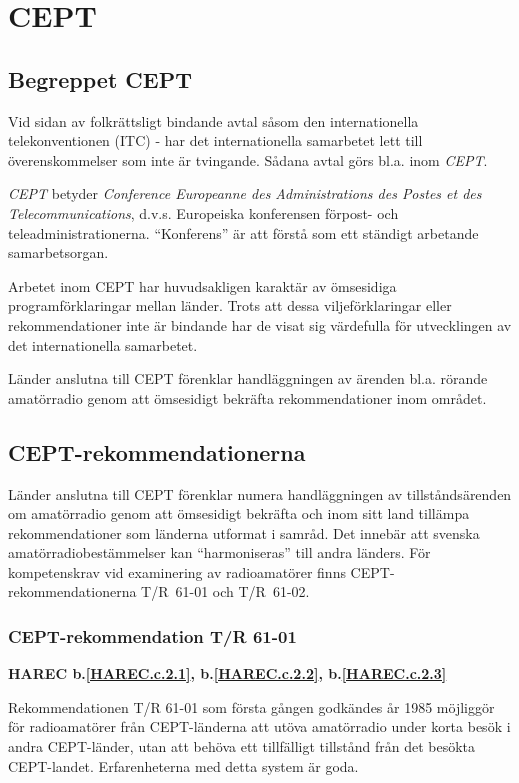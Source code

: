 \section{CEPT}

\subsection{Begreppet CEPT}

Vid sidan av folkrättsligt bindande avtal såsom den internationella
telekonventionen (ITC) - har det internationella samarbetet lett till
överenskommelser som inte är tvingande. Sådana avtal görs bl.a. inom
\emph{CEPT}.

\emph{CEPT} betyder \emph{Conference Europeanne des Administrations
  des Postes et des Telecommunications}, d.v.s. Europeiska konferensen
förpost- och teleadministrationerna. ``Konferens'' är att förstå som
ett ständigt arbetande samarbetsorgan.

Arbetet inom CEPT har huvudsakligen karaktär av ömsesidiga
programförklaringar mellan länder. Trots att dessa viljeförklaringar
eller rekommendationer inte är bindande har de visat sig värdefulla
för utvecklingen av det internationella samarbetet.

Länder anslutna till CEPT förenklar handläggningen av ärenden
bl.a. rörande amatörradio genom att ömsesidigt bekräfta
rekommendationer inom området.

\subsection{CEPT-rekommendationerna}

Länder anslutna till CEPT förenklar numera handläggningen av
tillståndsärenden om amatörradio genom att ömsesidigt bekräfta och
inom sitt land tillämpa rekommendationer som länderna utformat i
samråd. Det innebär att svenska amatörradiobestämmelser kan
``harmoniseras'' till andra länders.  För kompetenskrav vid
examinering av radioamatörer finns CEPT-rekommendationerna T/R~61-01
och T/R~61-02.

\subsubsection{CEPT-rekommendation T/R 61-01}
\textbf{
HAREC b.\ref{HAREC.c.2.1}\label{myHAREC.c.2.1},
 b.\ref{HAREC.c.2.2}\label{myHAREC.c.2.2},
 b.\ref{HAREC.c.2.3}\label{myHAREC.c.2.3}
}

Rekommendationen T/R 61-01 som första gången godkändes år 1985 möjliggör för
radioamatörer från CEPT-länderna att utöva amatörradio under korta besök i
andra CEPT-länder, utan att behöva ett tillfälligt tillstånd från det besökta
CEPT-landet. Erfarenheterna med detta system är goda.

